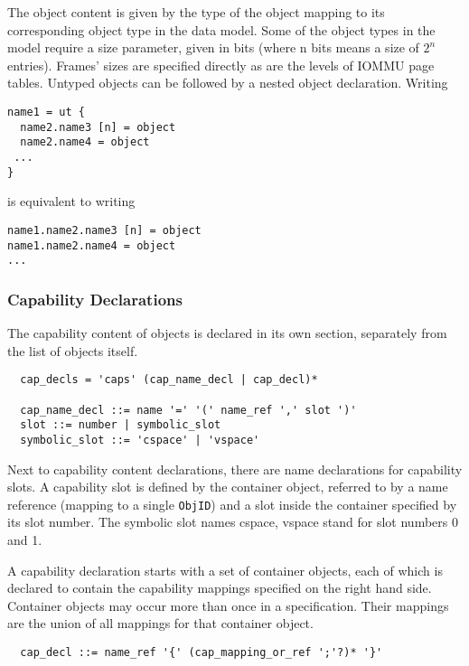 \documentclass[a4paper,11pt]{article}
\begin{document}
The object content is given by the type of the object mapping to its 
corresponding object type in the data model. Some of the object types in the 
model require a size parameter, given in bits (where n bits means a size of 
$2^n$ entries). Frames' sizes are specified directly as are the levels of IOMMU 
page tables. Untyped objects can be followed by a nested object declaration. 
Writing 

\begin{verbatim}
name1 = ut {
  name2.name3 [n] = object
  name2.name4 = object
 ...
}
\end{verbatim}

is equivalent to writing

\begin{verbatim}
name1.name2.name3 [n] = object
name1.name2.name4 = object
...
\end{verbatim}


\subsubsection{Capability Declarations}

The capability content of objects is declared in its own section, separately from the list of objects itself.

\begin{verbatim}
  cap_decls = 'caps' (cap_name_decl | cap_decl)*

  cap_name_decl ::= name '=' '(' name_ref ',' slot ')'
  slot ::= number | symbolic_slot
  symbolic_slot ::= 'cspace' | 'vspace' 
\end{verbatim}

Next to capability content declarations, there are name declarations for capability slots. A capability slot is defined by the container object, referred to by a name reference (mapping to a single \texttt{ObjID}) and a slot inside the container specified by its slot number. The symbolic slot names cspace, vspace stand for slot numbers 0 and 1.

A capability declaration starts with a set of container objects, each of which is declared to contain the capability mappings specified on the right hand side. Container objects may occur more than once in a specification. Their mappings are the union of all mappings for that container object.

\begin{verbatim}
  cap_decl ::= name_ref '{' (cap_mapping_or_ref ';'?)* '}'
\end{verbatim}
\end{document}
